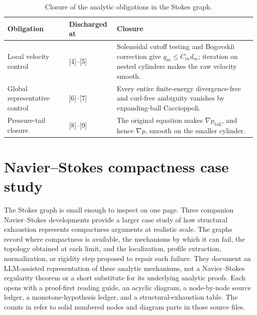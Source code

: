 \documentclass[11pt,reqno]{amsart}
\theoremstyle{plain}
\theoremstyle{definition}
\theoremstyle{remark}
\numberwithin{equation}{section}
\begin{document}
\begin{table}[H]
\caption{Closure of the analytic obligations in the Stokes graph.}
\label{tab:stokes-closure}
\centering
\small
\begin{tabularx}{\textwidth}{@{}L{0.25\textwidth}L{0.16\textwidth}Y@{}}
\toprule
Obligation & Discharged at & Closure \\
\midrule
Local velocity control & [4]--[5] & Solenoidal cutoff testing and Bogovski\u\i{}
correction give \(q_m\le C_md_m\); iteration on nested cylinders makes the raw
velocity smooth. \\
Global representative control & [6]--[7] & Every entire finite-energy
divergence-free and curl-free ambiguity vanishes by expanding-ball
Caccioppoli. \\
Pressure-tail closure & [8]--[9] & The original equation makes
\(\nabla p_{\mathrm{tail}}\), and hence \(\nabla p\), smooth on the smaller
cylinder. \\
\bottomrule
\end{tabularx}
\end{table}



\section{Navier--Stokes compactness case study}
\label{sec:navier-stokes-instances}

The Stokes graph is small enough to inspect on one page.  Three companion
Navier--Stokes developments provide a larger case study of how structural
exhaustion represents compactness arguments at realistic scale.  The graphs record where compactness
is available, the mechanisms by which it can fail, the topology obtained at
each limit, and the localization, profile extraction, normalization, or
rigidity step proposed to repair each failure.  They document an LLM-assisted
representation of these analytic mechanisms, not a Navier--Stokes regularity
theorem or a short substitute for its underlying analytic proofs.  Each opens with a proof-first reading guide, an acyclic diagram, a
node-by-node source ledger, a monotone-hypothesis ledger, and a structural-exhaustion
table.  The counts in
 refer to solid numbered nodes and diagram parts in
those source files.
\end{document}
